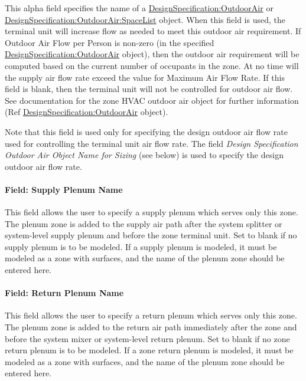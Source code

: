 This alpha field specifies the name of a \hyperref[designspecificationoutdoorair]{DesignSpecification:OutdoorAir} or \hyperref[designspecificationoutdoorairspacelist]{DesignSpecification:OutdoorAir:SpaceList} object. When this field is used, the terminal unit will increase flow as needed to meet this outdoor air requirement. If Outdoor Air Flow per Person is non-zero (in the specified \hyperref[designspecificationoutdoorair]{DesignSpecification:OutdoorAir} object), then the outdoor air requirement will be computed based on the current number of occupants in the zone. At no time will the supply air flow rate exceed the value for Maximum Air Flow Rate. If this field is blank, then the terminal unit will not be controlled for outdoor air flow. See documentation for the zone HVAC outdoor air object for further information (Ref \hyperref[designspecificationoutdoorair]{DesignSpecification:OutdoorAir} object).

Note that this field is used only for specifying the design outdoor air flow rate used for controlling the terminal unit air flow rate. The field \emph{Design Specification Outdoor Air Object Name for Sizing} (see below) is used to specify the design outdoor air flow rate.

\paragraph{Field: Supply Plenum Name}\label{field-supply-plenum-name-1}

This field allows the user to specify a supply plenum which serves only this zone. The plenum zone is added to the supply air path after the system splitter or system-level supply plenum and before the zone terminal unit. Set to blank if no supply plenum is to be modeled. If a supply plenum is modeled, it must be modeled as a zone with surfaces, and the name of the plenum zone should be entered here.

\paragraph{Field: Return Plenum Name}\label{field-return-plenum-name-1}

This field allows the user to specify a return plenum which serves only this zone. The plenum zone is added to the return air path immediately after the zone and before the system mixer or system-level return plenum. Set to blank if no zone return plenum is to be modeled. If a zone return plenum is modeled, it must be modeled as a zone with surfaces, and the name of the plenum zone should be entered here.

